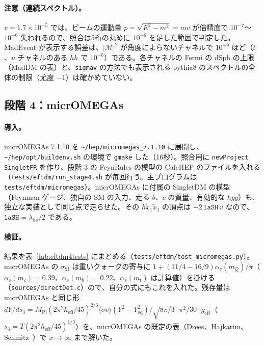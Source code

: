 \documentclass[a4paper,10pt]{ltjsarticle}
\newcommand{\pth}[1]{\texttt{\textasciitilde/}\nolinkurl{#1}}
\begin{document}
\paragraph{注意（連続スペクトル）。}$v=1.7\times10^{-5}$ では、ビームの運動量 $p=\sqrt{E^2-m^2}=mv$ が倍精度で $10^{-7}$〜$10^{-6}$ 失われるので、照合は5桁の丸めに $10^{-6}$ を足した範囲で判定した。MadEvent が表示する誤差は、$|\mathcal M|^2$ が角度によらないチャネルで $10^{-9}$ ほど（$t$、$u$ チャネルのある $hh$ で $10^{-6}$）である。各チャネルの Fermi の dSph の上限（MadDM の表）と、\texttt{sigmav} の方法でも表示される pythia8 のスペクトルの全体の制限（尤度 $-1$）は確かめていない。

\subsection{段階 4：micrOMEGAs}\label{sec:eftdm4}

\paragraph{導入。}micrOMEGAs 7.1.10 を \pth{hep/micromegas_7.1.10} に展開し、\pth{hep/opt/buildenv.sh} の環境で \texttt{gmake} した（16秒）。照合用に \texttt{newProject SingletFR} を作り、段階 3 の FeynRules の模型の CalcHEP のファイルを入れる（\nolinkurl{tests/eftdm/run_stage4.sh} が毎回行う。主プログラムは \nolinkurl{tests/eftdm/micromegas}）。micrOMEGAs に付属の SingletDM の模型（Feynman ゲージ、独自の SM の入力、走る $b$、$c$ の質量、有効的な $hgg$）も、独立な実装として同じ点で走らせた。その $h\tilde x_1\tilde x_1$ の頂点は $-2\,\mathtt{laSH}\,v$ なので、$\mathtt{laSH}=\lambda_{hs}/2$ である。

\paragraph{検証。}結果を表~\ref{tab:eftdm4tests} にまとめる（\nolinkurl{tests/eftdm/test_micromegas.py}）。micrOMEGAs の $\sigma_{\mathrm{SI}}$ は重いクォークの寄与に $1+(11/4-16/9)\alpha_s(m_Q)/\pi$（$\alpha_s(m_c)=0.39$、$\alpha_s(m_b)=0.22$、$\alpha_s(m_t)$ は計算値）を掛ける（\texttt{sources/directDet.c}）ので、自分の式にもこれを入れた。残存量は micrOMEGAs と同じ形 $dY/ds_3=M_{\mathrm{Pl}}(2\pi^2h_{\mathrm{eff}}/45)^{2/3}\langle\sigma v\rangle(Y^2-Y_{\mathrm{eq}}^2)/\sqrt{8\pi/3\cdot\pi^2/30\cdot g_{\mathrm{eff}}}$（$s_3=T(2\pi^2h_{\mathrm{eff}}/45)^{1/3}$）を、micrOMEGAs の既定の表（Drees、Hajkarim、Schmitz~\cite{dhs}）で $x\to\infty$ まで解いた。
\end{document}

